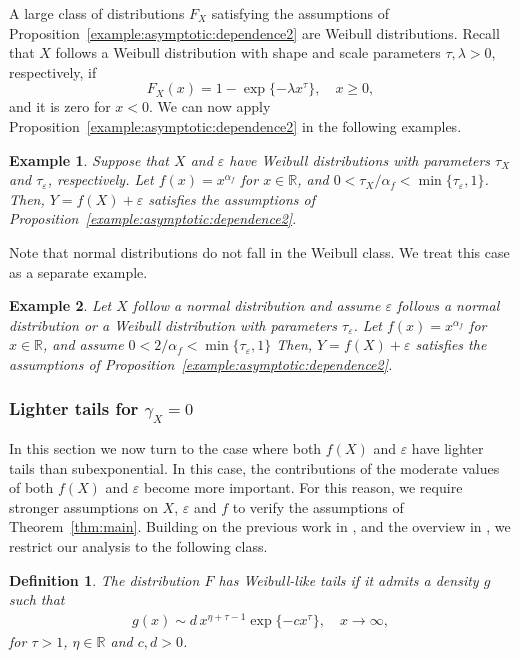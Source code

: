 \documentclass{statsoc}
\newtheorem{definition}{Definition}
\newtheorem{example}{Example}
\theoremstyle{break}
\newcommand{\beam}{\begin{eqnarray}}
\newcommand{\eeam}{\end{eqnarray}\noindent}
\begin{document}
A large class of distributions $F_X$ satisfying the assumptions of Proposition~\ref{example:asymptotic:dependence2} are Weibull distributions. 
Recall that $X$ follows a Weibull distribution with shape and scale parameters $\tau,\lambda > 0$, respectively, if 
\[ F_X(x) = 1 - \exp\{- \lambda x^{\tau}\}, \quad x\geq 0,\]
and it is zero for $x<0$.
 We can now apply Proposition~\ref{example:asymptotic:dependence2} in the following examples. 

\begin{example}\label{ex:exponential}
Suppose that $X$ and $\varepsilon$ have Weibull distributions with parameters $\tau_X$ and $\tau_\varepsilon$, respectively. Let $f(x) =  x^{\alpha_f}$ for $x \in\mathbb R$, and $ 0 < \tau_X/\alpha_f < \min\{ \tau_\varepsilon, 1\}$. 
Then, $Y= f(X) + \varepsilon$ satisfies the assumptions of Proposition~\ref{example:asymptotic:dependence2}.
\end{example} 

Note that normal distributions do not fall in the Weibull class. We treat this case as a separate example.

\begin{example}\label{ex:Gaussian}
Let $X$ follow a normal distribution and assume  $\varepsilon$ follows a normal distribution or a Weibull distribution with parameters $\tau_\varepsilon$. 
 Let $f(x) =  x^{\alpha_f}$ for $x \in \mathbb R$,  and assume $ 0 < 2/\alpha_f< \min\{ \tau_\varepsilon, 1\}$  Then, $Y= f(X) + \varepsilon$ satisfies the assumptions of Proposition~\ref{example:asymptotic:dependence2}.
\end{example} 


\subsubsection{Lighter tails for $\gamma_X=0$}\label{subsec:light:tails:gumbel}


In this section we now turn to the case where both $f(X)$ and $\varepsilon$ have lighter tails than subexponential. 
In this case, the contributions of the moderate values of both $f(X)$ and $\varepsilon$ become more important.  
For this reason, we require stronger assumptions on $X$, $\varepsilon$ and $f$ to verify the assumptions of Theorem~\ref{thm:main}.
Building on the previous work in \cite{bal1993}, and the overview in \cite{asmussen:hashorva:laub:taimre:2017}, we restrict our analysis to the following class. 
\begin{definition}
The distribution $F$ has Weibull-like tails if it admits a density $g$ such that
\beam\label{eq:den:assumptions:2}
g(x) \sim d \, x^{\eta + \tau - 1} \exp\{ - c x^{\tau}\}, \quad x \to \infty,  
\eeam	
for $\tau > 1$, $\eta \in \mathbb{R}$ and $c,d>0$.
\end{definition}
\end{document}
